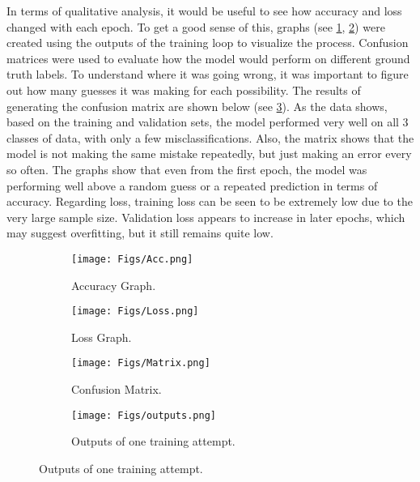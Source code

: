 In terms of qualitative analysis, it would be useful to see how accuracy and loss changed with each epoch. To get a good sense of this, graphs (see \ref{fig:acc}, \ref{fig:loss}) were created using the outputs of the training loop to visualize the process. Confusion matrices were used to evaluate how the model would perform on different ground truth labels. To understand where it was going wrong, it was important to figure out how many guesses it was making for each possibility. The results of generating the confusion matrix are shown below (see \ref{fig:cm}). As the data shows, based on the training and validation sets, the model performed very well on all 3 classes of data, with only a few misclassifications. Also, the matrix shows that the model is not making the same mistake repeatedly, but just making an error every so often. The graphs show that even from the first epoch, the model was performing well above a random guess or a repeated prediction in terms of accuracy. Regarding loss, training loss can be seen to be extremely low due to the very large sample size. Validation loss appears to increase in later epochs, which may suggest overfitting, but it still remains quite low. 

\begin{figure}[!ht]
    \begin{subfigure}{0.48\textwidth}
        \centering
        \texttt{[image: Figs/Acc.png]}
        \caption{Accuracy Graph.}
        \label{fig:acc}
    \end{subfigure}
    \hfill
    \begin{subfigure}{0.48\textwidth}
        \centering
        \texttt{[image: Figs/Loss.png]}
        \caption{Loss Graph.}
        \label{fig:loss}
    \end{subfigure}
    \hfill
    \begin{subfigure}{0.48\textwidth}
        \centering
        \texttt{[image: Figs/Matrix.png]}
        \caption{Confusion Matrix.}
        \label{fig:cm}
    \end{subfigure}
    \hfill
    \begin{subfigure}{0.48\textwidth}
        \centering
        \texttt{[image: Figs/outputs.png]}
        \caption{Outputs of one training attempt.}
        \label{fig:output}
    \end{subfigure}
    \hfill
\end{figure}
